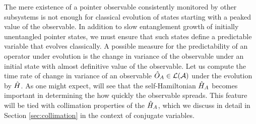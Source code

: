 \documentclass[aps,pra,onecolumn,nofootinbib,11pt,tightenlines]{revtex4-1}
\begin{document}
The mere existence of a pointer observable consistently monitored by other subsystems is not enough for classical evolution of states starting with a peaked value of the observable. In addition to slow entanglement growth of initially unentangled pointer states, we must ensure that such states define a predictable variable that evolves classically. A possible measure for the predictability of an operator under evolution is the change in variance of the observable under an initial state with almost definitive value of the observable. Let us compute the time rate of change in variance of an observable $\hat{O}_{A} \in \mathcal{L}(\mathcal{A})$ under the evolution by $\hat{H}$. {As one might expect, will see that the self-Hamiltonian $\hat{H}_{A}$ becomes important in determining the how quickly the observable spreads. This feature will be tied with collimation properties of the $\hat{H}_{A}$, which we discuss in detail in Section \ref{sec:collimation} in the context of conjugate variables.}
\end{document}
